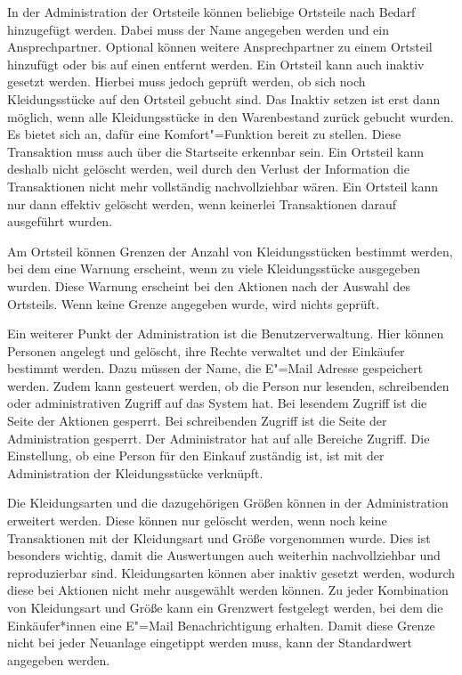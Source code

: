 In der Administration der Ortsteile können beliebige Ortsteile nach Bedarf hinzugefügt werden. Dabei muss der Name angegeben werden und ein Ansprechpartner. Optional können weitere Ansprechpartner zu einem Ortsteil hinzufügt oder bis auf einen entfernt werden. Ein Ortsteil kann auch inaktiv gesetzt werden. Hierbei muss jedoch geprüft werden, ob sich noch Kleidungsstücke auf den Ortsteil gebucht sind. Das Inaktiv setzen ist erst dann möglich, wenn alle Kleidungsstücke in den Warenbestand zurück gebucht wurden. Es bietet sich an, dafür eine Komfort"=Funktion bereit zu stellen. Diese Transaktion muss auch über die Startseite erkennbar sein. Ein Ortsteil kann deshalb nicht gelöscht werden, weil durch den Verlust der Information die Transaktionen nicht mehr vollständig nachvollziehbar wären. Ein Ortsteil kann nur dann effektiv gelöscht werden, wenn keinerlei Transaktionen darauf ausgeführt wurden.

Am Ortsteil können Grenzen der Anzahl von Kleidungsstücken bestimmt werden, bei dem eine Warnung erscheint, wenn zu viele Kleidungsstücke ausgegeben wurden. Diese Warnung erscheint bei den Aktionen nach der Auswahl des Ortsteils. Wenn keine Grenze angegeben wurde, wird nichts geprüft.

Ein weiterer Punkt der Administration ist die Benutzerverwaltung. Hier können Personen angelegt und gelöscht, ihre Rechte verwaltet und der Einkäufer bestimmt werden. Dazu müssen der Name, die E"=Mail Adresse gespeichert werden. Zudem kann gesteuert werden, ob die Person nur lesenden, schreibenden oder administrativen Zugriff auf das System hat. Bei lesendem Zugriff ist die Seite der Aktionen gesperrt. Bei schreibenden Zugriff ist die Seite der Administration gesperrt. Der Administrator hat auf alle Bereiche Zugriff. Die Einstellung, ob eine Person für den Einkauf zuständig ist, ist mit der Administration der Kleidungsstücke verknüpft. 

Die Kleidungsarten und die dazugehörigen Größen können in der Administration erweitert werden. Diese können nur gelöscht werden, wenn noch keine Transaktionen mit der Kleidungsart und Größe vorgenommen wurde. Dies ist besonders wichtig, damit die Auswertungen auch weiterhin nachvollziehbar und reproduzierbar sind. Kleidungsarten können aber inaktiv gesetzt werden, wodurch diese bei Aktionen nicht mehr ausgewählt werden können. Zu jeder Kombination von Kleidungsart und Größe kann ein Grenzwert festgelegt werden, bei dem die Einkäufer*innen eine E"=Mail Benachrichtigung erhalten. Damit diese Grenze nicht bei jeder Neuanlage eingetippt werden muss, kann der Standardwert angegeben werden.

